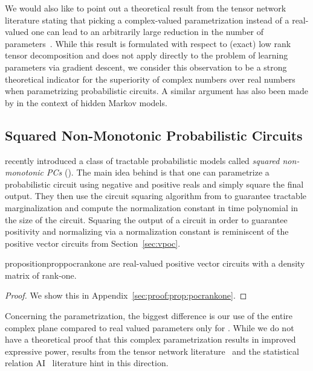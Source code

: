 We would also like to point out a theoretical result from the tensor network literature stating that picking a complex-valued parametrization instead of a real-valued one can lead to an arbitrarily large reduction in the number of parameters~\citep{glasser2019expressive}. While this result is formulated with respect to (exact) low rank tensor decomposition and does not apply directly to the problem of learning parameters via gradient descent, we consider this observation to be a strong theoretical indicator for the superiority of complex numbers over real numbers when parametrizing probabilistic circuits. A similar argument has also been made by \citet{gao2022enhancing} in the context of hidden Markov models.



\subsection*{Squared Non-Monotonic Probabilistic Circuits}
\citet{loconte2024subtractive} recently introduced a class of tractable probabilistic models called \textit{squared non-monotonic PCs} (\snpcs). The main idea behind \snpcs is that one can parametrize a probabilistic circuit using negative and positive reals and simply square the final output.
They then use the circuit squaring algorithm from \citep{vergari2021compositional} to guarantee tractable marginalization and compute the normalization constant in time polynomial in the size of the circuit.
Squaring the output of a circuit in order to guarantee positivity and normalizing via a normalization constant is reminiscent of the positive vector circuits from Section~\ref{sec:vpoc}.

\begin{restatable}{proposition}{proppocrankone}
	\label{prop:pocrankone}
	\snpcs are real-valued positive vector circuits with a density matrix of rank-one.
\end{restatable}


\begin{proof}
	We show this in Appendix~\ref{sec:proof:prop:pocrankone}.
\end{proof}



Concerning the parametrization, the biggest difference is our use of the entire complex plane compared to real valued parameters only for \snpcs. While we do not have a theoretical proof that this complex parametrization results in improved expressive power, results from the tensor network literature~\citep{glasser2019expressive} and the statistical relation AI~\citep{buchman2017rules,kuzelka2020complex} literature hint in this direction.

